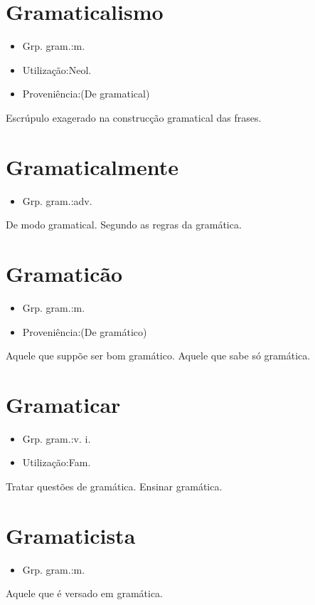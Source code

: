 \section{Gramaticalismo}
\begin{itemize}
\item {Grp. gram.:m.}
\end{itemize}
\begin{itemize}
\item {Utilização:Neol.}
\end{itemize}
\begin{itemize}
\item {Proveniência:(De \textunderscore gramatical\textunderscore )}
\end{itemize}
Escrúpulo exagerado na construcção gramatical das frases.
\section{Gramaticalmente}
\begin{itemize}
\item {Grp. gram.:adv.}
\end{itemize}
De modo gramatical.
Segundo as regras da gramática.
\section{Gramaticão}
\begin{itemize}
\item {Grp. gram.:m.}
\end{itemize}
\begin{itemize}
\item {Proveniência:(De \textunderscore gramático\textunderscore )}
\end{itemize}
Aquele que suppõe ser bom gramático.
Aquele que sabe só gramática.
\section{Gramaticar}
\begin{itemize}
\item {Grp. gram.:v. i.}
\end{itemize}
\begin{itemize}
\item {Utilização:Fam.}
\end{itemize}
Tratar questões de gramática.
Ensinar gramática.
\section{Gramaticista}
\begin{itemize}
\item {Grp. gram.:m.}
\end{itemize}
Aquele que é versado em gramática.
